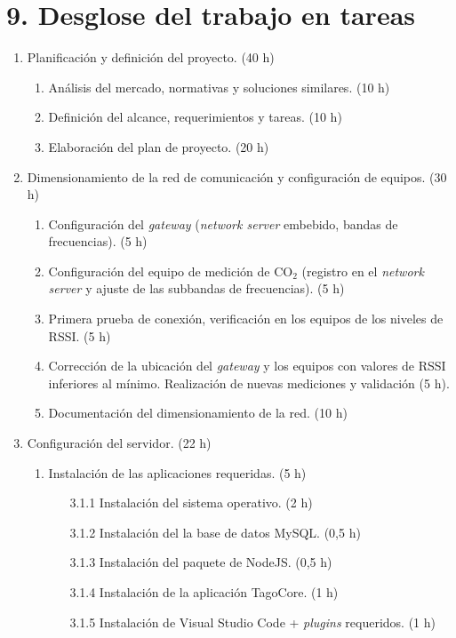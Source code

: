 \documentclass[
11pt, %
]{charter}
\begin{document}
\section{9. Desglose del trabajo en tareas}
\label{sec:wbs}
\begin{enumerate}
\item Planificación y definición del proyecto. (40 h)
	\begin{enumerate}
	\item Análisis del mercado, normativas y soluciones similares. (10 h)
	\item Definición del alcance, requerimientos y tareas. (10 h)
	\item Elaboración del plan de proyecto. (20 h)
	\end{enumerate}
\item Dimensionamiento de la red de comunicación y configuración de equipos.  (30 h)
	\begin{enumerate}
	\item Configuración del \textit{gateway} (\textit{network server }embebido, bandas de frecuencias). (5 h)
	\item Configuración del equipo de medición de CO$_{2}$ (registro en el \textit{network server} y ajuste de las subbandas de frecuencias). (5 h)
	\item Primera prueba de conexión, verificación en los equipos de los niveles de RSSI. (5 h)
	\item Corrección de la ubicación del \textit{gateway} y los equipos con valores de RSSI inferiores al mínimo. Realización de nuevas mediciones y validación (5 h).
	\item Documentación del dimensionamiento de la red. (10 h)
	\end{enumerate}
\item Configuración del servidor.  (22 h)
	\begin{enumerate}
	\item Instalación de las aplicaciones requeridas. (5 h)
		\begin{enumerate}
		\item[3.1.1]Instalación del sistema operativo.	(2 h)
		\item[3.1.2]Instalación del la base de datos MySQL. (0,5 h)
		\item[3.1.3]Instalación del paquete de NodeJS.	(0,5 h)
		\item[3.1.4]Instalación de la aplicación TagoCore. (1 h)
		\item[3.1.5]Instalación de Visual Studio Code + \textit{plugins} requeridos. (1 h)

\end{enumerate}
\end{enumerate}
\end{enumerate}
\end{document}
